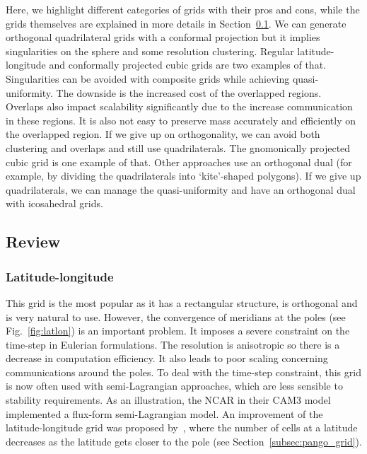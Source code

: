 Here, we highlight different categories of grids with their pros and cons, while
the grids themselves are explained in more details in Section~\ref{subsec:grids}.
We can generate orthogonal quadrilateral grids with a \gls{conformal} projection
but it implies singularities on the sphere and some resolution clustering.
Regular latitude-longitude and conformally projected cubic grids are two
examples of that. Singularities can be avoided with composite grids
while achieving quasi-uniformity. The downside is the increased cost of the
overlapped regions. Overlaps also impact scalability significantly due to the
increase communication in these regions. It is also not easy to preserve mass
accurately and efficiently on the overlapped region. If we give up on
orthogonality, we can avoid both clustering and overlaps and still use
quadrilaterals. The gnomonically projected cubic grid is one example of that.
Other approaches use an orthogonal dual (for example, by dividing the
quadrilaterals into `kite'-shaped polygons). If we give up quadrilaterals, we
can manage the quasi-uniformity and have an orthogonal dual with icosahedral
grids.

\subsection{Review}
\label{subsec:grids}
\subsubsection{Latitude-longitude}
This grid is the most popular as it has a rectangular structure, is orthogonal
and is very natural to use. However, the convergence of meridians at the poles
(see Fig.~\ref{fig:latlon}) is an important problem. It imposes a severe
constraint on the time-step in Eulerian formulations. The resolution
is anisotropic so there is a decrease in computation efficiency. It also leads
to poor scaling concerning communications around the poles. To deal with the
time-step constraint, this grid is now often used with semi-Lagrangian
approaches, which are less sensible to stability requirements. As an
illustration, the \gls{NCAR} in their CAM3 model implemented a flux-form
semi-Lagrangian model. An improvement of the latitude-longitude grid was
proposed by~\cite{Kurihara1965}, where the number of cells at a latitude
decreases as the latitude gets closer to the pole (see
Section~\ref{subsec:pango_grid}).

